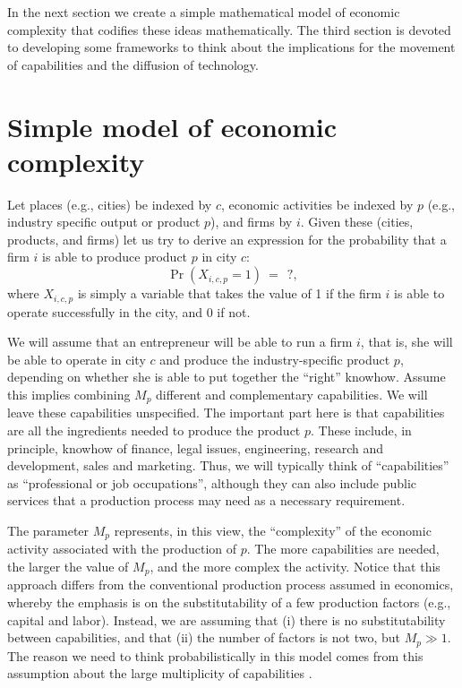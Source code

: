 \documentclass[12pt]{article}
\begin{document}
In the next section we create a simple mathematical model of economic complexity that codifies these ideas mathematically. The third section is devoted to developing some frameworks to think about the implications for the movement of capabilities and the diffusion of technology.



\section{Simple model of economic complexity}\label{sec_model}
Let places (e.g., cities) be indexed by $c$, economic activities be indexed by $p$ (e.g., industry specific output or product $p$), and firms by $i$. Given these (cities, products, and firms) let us try to derive an expression for the probability that a firm $i$ is able to produce product $p$ in city $c$: $$ \Pr(X_{i,c,p}=1)~=~~?,$$
where $X_{i,c,p}$ is simply a variable that takes the value of 1 if the firm $i$ is able to operate successfully in the city, and 0 if not.

We will assume that an entrepreneur will be able to run a firm $i$, that is, she will be able to operate in city $c$ and produce the industry-specific product $p$, depending on whether she is able to put together the ``right'' knowhow. Assume this implies combining $M_p$ different and complementary capabilities. We will leave these capabilities unspecified. The important part here is that capabilities are all the ingredients needed to produce the product $p$. These include, in principle, knowhow of finance, legal issues, engineering, research and development, sales and marketing. Thus, we will typically think of ``capabilities'' as ``professional or job occupations'', although they can also include public services that a production process may need as a necessary requirement.

The parameter $M_p$ represents, in this view, the ``complexity'' of the economic activity associated with the production of $p$. The more capabilities are needed, the larger the value of $M_p$, and the more complex the activity. Notice that this approach differs from the conventional production process assumed in economics, whereby the emphasis is on the substitutability of a few production factors (e.g., capital and labor). Instead, we are assuming that (i) there is no substitutability between capabilities, and that (ii) the number of factors is not two, but $M_p \gg 1$. The reason we need to think probabilistically in this model comes from this assumption about the large multiplicity of capabilities \citep{gomez2016explaining}. 
\end{document}
